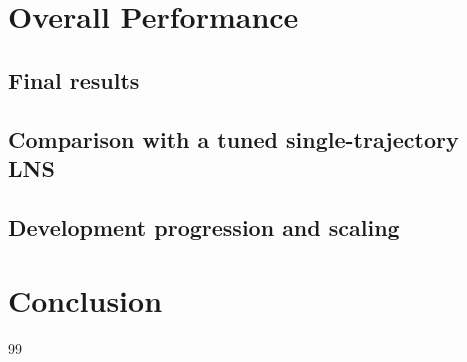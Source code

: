 \documentclass[10pt, a4paper]{article}
\begin{document}
\section{Overall Performance}
\subsection{Final results}
\subsection{Comparison with a tuned single-trajectory LNS}
\subsection{Development progression and scaling}

\section{Conclusion}

\begin{thebibliography}{99}
\end{thebibliography}
\end{document}
